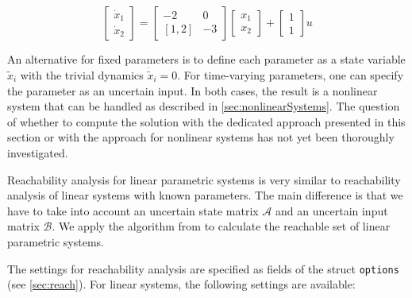 \begin{center}
\begin{minipage}[t]{0.48\textwidth}
	\vspace{22pt}
	\begin{equation*}
	\begin{bmatrix} \dot x_1 \\ \dot x_2 \end{bmatrix} = \begin{bmatrix} -2 & 0 \\ [1,2] & -3 \end{bmatrix} \begin{bmatrix} x_1 \\ x_2 \end{bmatrix} + \begin{bmatrix} 1 \\ 1 \end{bmatrix} u
\end{equation*}
\end{minipage}
\begin{minipage}[t]{0.48\textwidth}
	\footnotesize
	
\end{minipage}
\end{center}

An alternative for fixed parameters is to define each parameter as a state variable $\tilde{x}_i$ with the trivial dynamics $\dot{\tilde{x}}_i = 0$. For time-varying parameters, one can specify the parameter as an uncertain input. In both cases, the result is a nonlinear system that can be handled as described in \cref{sec:nonlinearSystems}. The question of whether to compute the solution with the dedicated approach presented in this section or with the approach for nonlinear systems has not yet been thoroughly investigated.



Reachability analysis for linear parametric  systems is very similar to reachability analysis of linear systems with known parameters. The main difference is that we have to take into account an uncertain state matrix $\mathcal{A}$ and an uncertain input matrix $\mathcal{B}$. We apply the algorithm from \cite{Althoff2007c} to calculate the reachable set of linear parametric systems.

The settings for reachability analysis are specified as fields of the struct \texttt{options} (see \cref{sec:reach}). For linear systems, the following settings are available:

